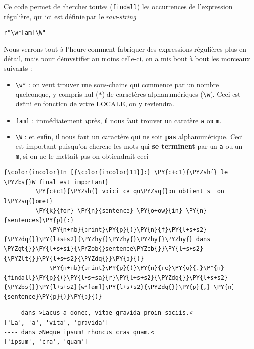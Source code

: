     Ce code permet de chercher toutes (\texttt{findall}) les occurrences de
l'expression régulière, qui ici est définie par le \emph{raw-string}

\begin{verbatim}
r"\w*[am]\W"
\end{verbatim}

Nous verrons tout à l'heure comment fabriquer des expressions régulières
plus en détail, mais pour démystifier au moins celle-ci, on a mis bout à
bout les morceaux suivants :

\begin{itemize}
	\item 
	\texttt{\textbackslash{}w*} : on veut
	trouver une sous-chaine qui commence par un nombre quelconque, y compris
	nul (\texttt{*}) de caractères alphanumériques
	(\texttt{\textbackslash{}w}). Ceci est défini en fonction de votre
	LOCALE, on y reviendra.
	\item
	\texttt{{[}am{]}} : immédiatement après, il
	nous faut trouver un caratère \texttt{a} ou \texttt{m}.
	\item
	\texttt{\textbackslash{}W} : et enfin, il nous faut un caractère qui ne
	soit \textbf{pas} alphanumérique. Ceci est important puisqu'on cherche
	les mots qui \textbf{se terminent} par un \texttt{a} ou un \texttt{m},
	si on ne le mettait pas on obtiendrait ceci
\end{itemize}

    \begin{Verbatim}[commandchars=\\\{\}]
{\color{incolor}In [{\color{incolor}11}]:} \PY{c+c1}{\PYZsh{} le \PYZbs{}W final est important}
         \PY{c+c1}{\PYZsh{} voici ce qu\PYZsq{}on obtient si on l\PYZsq{}omet}
         \PY{k}{for} \PY{n}{sentence} \PY{o+ow}{in} \PY{n}{sentences}\PY{p}{:}
             \PY{n+nb}{print}\PY{p}{(}\PY{n}{f}\PY{l+s+s2}{\PYZdq{}}\PY{l+s+s2}{\PYZhy{}\PYZhy{}\PYZhy{}\PYZhy{} dans \PYZgt{}}\PY{l+s+si}{\PYZob{}sentence\PYZcb{}}\PY{l+s+s2}{\PYZlt{}}\PY{l+s+s2}{\PYZdq{}}\PY{p}{)}
             \PY{n+nb}{print}\PY{p}{(}\PY{n}{re}\PY{o}{.}\PY{n}{findall}\PY{p}{(}\PY{l+s+sa}{r}\PY{l+s+s2}{\PYZdq{}}\PY{l+s+s2}{\PYZbs{}}\PY{l+s+s2}{w*[am]}\PY{l+s+s2}{\PYZdq{}}\PY{p}{,} \PY{n}{sentence}\PY{p}{)}\PY{p}{)}
\end{Verbatim}


    \begin{Verbatim}[commandchars=\\\{\}]
---- dans >Lacus a donec, vitae gravida proin sociis.<
['La', 'a', 'vita', 'gravida']
---- dans >Neque ipsum! rhoncus cras quam.<
['ipsum', 'cra', 'quam']

    \end{Verbatim}

